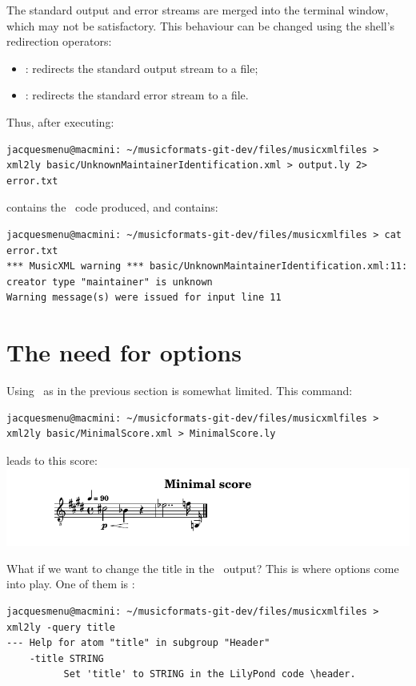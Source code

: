 The standard output and error streams are merged into the terminal window, which may not be satisfactory.
This behaviour can be changed using the shell's redirection operators:
\begin{itemize}
\item \code{>}: redirects the standard output stream to a file;
\item {}: redirects the standard error stream to a file.
\end{itemize}

Thus, after executing:
\begin{lstlisting}[language=Terminal]
jacquesmenu@macmini: ~/musicformats-git-dev/files/musicxmlfiles > xml2ly basic/UnknownMaintainerIdentification.xml > output.ly 2> error.txt
\end{lstlisting}

 contains the \lily\ code produced, and  contains:
\begin{lstlisting}[language=Terminal]
jacquesmenu@macmini: ~/musicformats-git-dev/files/musicxmlfiles > cat error.txt
*** MusicXML warning *** basic/UnknownMaintainerIdentification.xml:11: creator type "maintainer" is unknown
Warning message(s) were issued for input line 11
\end{lstlisting}


\section{The need for options}

Using \xmlToLy\ as in the previous section is somewhat limited. This command:
\begin{lstlisting}[language=Terminal]
jacquesmenu@macmini: ~/musicformats-git-dev/files/musicxmlfiles > xml2ly basic/MinimalScore.xml > MinimalScore.ly
\end{lstlisting}

leads to this score:\\
\includegraphics[scale=0.7]{../graphics/MinimalScore.png}

What if we want to change the title in the \lily\ output? This is where options come into play. One of them is :
\begin{lstlisting}[language=Terminal]
jacquesmenu@macmini: ~/musicformats-git-dev/files/musicxmlfiles > xml2ly -query title
--- Help for atom "title" in subgroup "Header"
    -title STRING
          Set 'title' to STRING in the LilyPond code \header.
\end{lstlisting}

